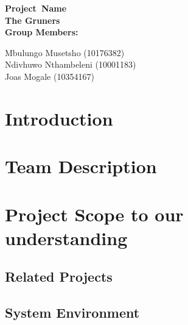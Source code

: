 \documentclass[12pt]{article}
\newcommand{\Title}{Project\ Name} %
\begin{document}
        \vspace{4em}
        
        \begin{center}%
        
          \LARGE \bf \Title \\[4em]
          \LARGE {\bf The Gruners}\\[1em]
          \LARGE {\bf Group Members:}\\[2em]
          \large
          
             Mbulungo Musetsho                          (10176382) \\[1em]
             Ndivhuwo Nthambeleni (10001183)	\\[1em]
             Joas Mogale (10354167)		\\[1em]
            
        \end{center}%
        

        \newpage
        \tableofcontents    
                \newpage
                \section{Introduction}
                \section{Team Description}
                \section{Project Scope to our understanding}
                    \subsection{Related Projects}
                    \subsection{System Environment}
                    
\end{document}
